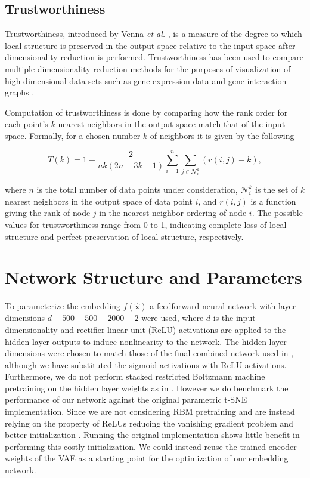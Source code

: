 \subsection{Trustworthiness}

Trustworthiness, introduced by Venna \textit{et al.} \cite{trustworthiness}, is a measure of the degree to which local structure is preserved in the output space relative to the input space after dimensionality reduction is performed. Trustworthiness has been used to compare multiple dimensionality reduction methods for the purposes of visualization of high dimensional data sets such as gene expression data \cite{trustworthiness_gene_expression} and gene interaction graphs \cite{trustworthiness_gene_interaction}.

Computation of trustworthiness is done by comparing how the rank order for each point's $k$ nearest neighbors in the output space match that of the input space. Formally, for a chosen number $k$ of neighbors it is given by the following 

$$T(k) = 1 - \frac{2}{nk (2n - 3k - 1)} \sum^{n}_{i=1} \sum_{j \in \mathcal{N}_{i}^{k}} (r(i, j) - k),$$

where $n$ is the total number of data points under consideration, $\mathcal{N}_{i}^{k}$ is the set of $k$ nearest neighbors in the output space of data point $i$, and $r(i, j)$ is a function giving the rank of node $j$ in the nearest neighbor ordering of node $i$. The possible values for trustworthiness range from 0 to 1, indicating complete loss of local structure and perfect preservation of local structure, respectively.

\section{Network Structure and Parameters}
\label{section:network_structure_and_parameters}

To parameterize the embedding $f(\mathbf{\hat{x}})$ a feedforward neural network with layer dimensions $d - 500 - 500 - 2000 - 2$ were used, where $d$ is the input dimensionality and rectifier linear unit (ReLU) activations are applied to the hidden layer outputs to induce nonlinearity to the network. The hidden layer dimensions were chosen to match those of the final combined network used in \cite{parametric_tsne}, although we have substituted the sigmoid activations with ReLU activations. Furthermore, we do not perform stacked restricted Boltzmann machine pretraining on the hidden layer weights as in \cite{parametric_tsne}. However we do benchmark the performance of our network against the original parametric t-SNE implementation. Since we are not considering RBM pretraining and are instead relying on the property of ReLUs reducing the vanishing gradient problem \cite{relu} and better initialization \cite{xavier_initializer}. Running the original implementation shows little benefit in performing this costly initialization. We could instead reuse the trained encoder weights of the VAE as a starting point for the optimization of our embedding network.

